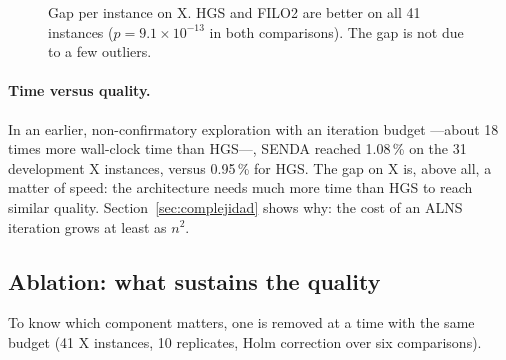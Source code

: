 \documentclass[11pt,a4paper]{article}
\newcommand{\senda}{SENDA}
\begin{document}
\begin{figure}[H]
\centering
{}
\caption{Gap per instance on X. HGS and FILO2 are better on all 41 instances ($p=9.1\times10^{-13}$ in
both comparisons). The gap is not due to a few outliers.}
\label{fig:x}
\end{figure}

\paragraph{Time versus quality.} In an earlier, non-confirmatory exploration with an iteration budget
---about 18 times more wall-clock time than HGS---, SENDA reached 1.08\,\% on the 31 development X
instances, versus 0.95\,\% for HGS. The gap on X is, above all, a matter of speed: the architecture
needs much more time than HGS to reach similar quality. Section~\ref{sec:complejidad} shows why: the
cost of an ALNS iteration grows at least as $n^2$.

\subsection{Ablation: what sustains the quality}
\label{sec:ablacion}
To know which component matters, one is removed at a time with the same budget (41 X instances, 10
replicates, Holm correction over six comparisons).
\end{document}
